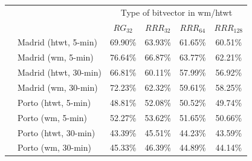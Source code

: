 	\begin{table}[ht]
	
	\begin{center}
	  \begin{tabular}{|c|l|*{4}{c}|}
	  \cline{3-6}
	  \multicolumn{2}{c|}{} & \multicolumn{4}{c|}{Type of bitvector in \gls{wm}/\gls{htwt}} \\

	  \multicolumn{2}{c|}{}     &$RG_{32}$& $RRR_{32}$& $RRR_{64}$&$RRR_{128}$ \\
	  \hline
	  \multirow{8}{*}{\STAB{\rotatebox[origin=c]{90}{$t_{\Psi}=32$}}}
	   & Madrid (\gls{htwt}, 5-min)  & 69.90\% &   63.93\% &   61.65\% &   60.51\% \\
	   & Madrid (\gls{wm}, 5-min)     & 76.64\% &   66.87\% &   63.77\% &   62.21\% \\
	   & Madrid (\gls{htwt}, 30-min) & 66.81\% &   60.11\% &   57.99\% &   56.92\% \\
	   & Madrid (\gls{wm}, 30-min)    & 72.23\% &   62.32\% &   59.61\% &   58.25\% \\
	  \cline{2-6}
	   & Porto (\gls{htwt}, 5-min)   & 48.81\% &   52.08\% &   50.52\% &   49.74\% \\
	   & Porto (\gls{wm}, 5-min)      & 52.27\% &   53.62\% &   51.65\% &   50.66\% \\
	   & Porto (\gls{htwt}, 30-min)  & 43.39\% &   45.51\% &   44.23\% &   43.59\% \\
	   & Porto (\gls{wm}, 30-min)     & 45.33\% &   46.39\% &   44.89\% &   44.14\% \\
	  \hline
	  


\end{tabular}
\end{center}
\end{table}
